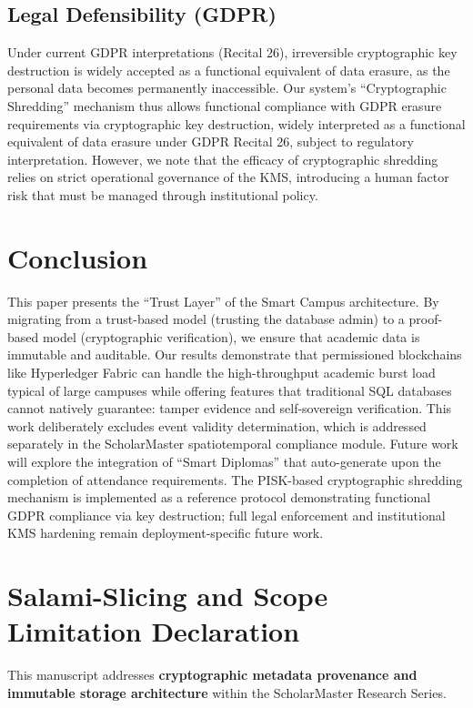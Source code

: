 \documentclass[conference]{IEEEtran}
\begin{document}
\subsection{Legal Defensibility (GDPR)}
Under current GDPR interpretations (Recital 26), irreversible cryptographic key destruction is widely accepted as a functional equivalent of data erasure, as the personal data becomes permanently inaccessible. Our system's ``Cryptographic Shredding'' mechanism thus allows functional compliance with GDPR erasure requirements via cryptographic key destruction, widely interpreted as a functional equivalent of data erasure under GDPR Recital 26, subject to regulatory interpretation. However, we note that the efficacy of cryptographic shredding relies on strict operational governance of the KMS, introducing a human factor risk that must be managed through institutional policy.

\section{Conclusion}
This paper presents the ``Trust Layer'' of the Smart Campus architecture. By migrating from a trust-based model (trusting the database admin) to a proof-based model (cryptographic verification), we ensure that academic data is immutable and auditable. Our results demonstrate that permissioned blockchains like Hyperledger Fabric can handle the high-throughput academic burst load typical of large campuses while offering features that traditional SQL databases cannot natively guarantee: tamper evidence and self-sovereign verification. This work deliberately excludes event validity determination, which is addressed separately in the ScholarMaster spatiotemporal compliance module. Future work will explore the integration of ``Smart Diplomas'' that auto-generate upon the completion of attendance requirements. The PISK-based cryptographic shredding mechanism is implemented as a reference protocol demonstrating functional GDPR compliance via key destruction; full legal enforcement and institutional KMS hardening remain deployment-specific future work.

\section*{Salami-Slicing and Scope Limitation Declaration}
This manuscript addresses \textbf{cryptographic metadata provenance and immutable storage architecture} within the ScholarMaster Research Series.
\end{document}
